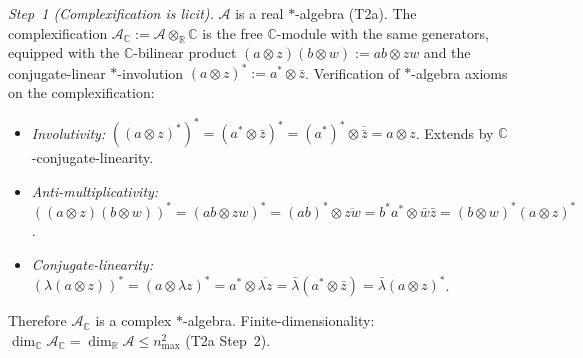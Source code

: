 \documentclass[11pt]{article}
\theoremstyle{remark}
\begin{document}
\begin{tcolorbox}[apfbox, title={T2b: Complexification and Wedderburn Decomposition}]
\textit{Step~1 (Complexification is licit).}  $\mathcal{A}$ is a real $*$-algebra (T2a).  The complexification $\mathcal{A}_\mathbb{C} := \mathcal{A} \otimes_\mathbb{R} \mathbb{C}$ is the free $\mathbb{C}$-module with the same generators, equipped with the $\mathbb{C}$-bilinear product $(a \otimes z)(b \otimes w) := ab \otimes zw$ and the conjugate-linear $*$-involution $(a \otimes z)^* := a^* \otimes \bar{z}$.  Verification of $*$-algebra axioms on the complexification:
\begin{itemize}[nosep,leftmargin=2em]
\item \emph{Involutivity:} $((a \otimes z)^*)^* = (a^* \otimes \bar{z})^* = (a^*)^* \otimes \overline{\bar{z}} = a \otimes z$.  Extends by $\mathbb{C}$-conjugate-linearity.
\item \emph{Anti-multiplicativity:} $((a\otimes z)(b\otimes w))^* = (ab \otimes zw)^* = (ab)^* \otimes \overline{zw} = b^*a^* \otimes \bar{w}\bar{z} = (b\otimes w)^*(a\otimes z)^*$.
\item \emph{Conjugate-linearity:} $(\lambda(a\otimes z))^* = (a\otimes \lambda z)^* = a^* \otimes \overline{\lambda z} = \bar{\lambda}(a^* \otimes \bar{z}) = \bar{\lambda}(a\otimes z)^*$.
\end{itemize}
Therefore $\mathcal{A}_\mathbb{C}$ is a complex $*$-algebra.  Finite-dimensionality: $\dim_\mathbb{C} \mathcal{A}_\mathbb{C} = \dim_\mathbb{R} \mathcal{A} \le n_{\max}^2$ (T2a Step~2).


\end{tcolorbox}
\end{document}
